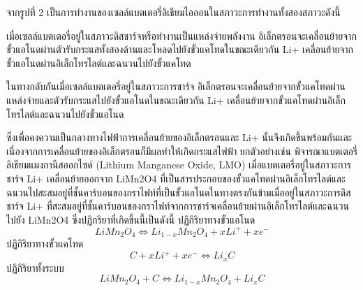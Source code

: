 จากรูปที่ 2 เป็นการทำงานของเซลล์แบตเตอรี่ลิเธียมไอออนในสภาวะการทำงานทั้งสองสภาวะดังนี้
\begin{itemize}
	{\item
		เมื่อเซลล์แบตเตอรี่อยู่ในสภาวะดิสชาร์จหรือทำงานเป็นแหล่งจ่ายพลังงาน อิเล็กตรอนจะเคลื่อนย้ายจากขั้วแอโนดผ่านตัวรับกระแสทั้งสองด้านและโหลดไปยังขั้วแคโทดในขณะเดียวกัน Li+ เคลื่อนย้ายจากขั้วแอโนดผ่านอิเล็กโทรไลต์และฉนวนไปยังขั้วแคโทด}
	{\item
		ในทางกลับกันเมื่อเซลล์แบตเตอรี่อยู่ในสภาวะการชาร์จ อิเล็กตรอนจะเคลื่อนย้ายจากขั้วแคโทดผ่านแหล่งจ่ายและตัวรับกระแสไปยังขั้วแอโนดในขณะเดียวกัน Li+ เคลื่อนย้ายจากขั้วแคโทดผ่านอิเล็กโทรไลต์และฉนวนไปยังขั้วแอโนด}
\end{itemize}
 ซึ่งเพื่อคงความเป็นกลางทางไฟฟ้าการเคลื่อนย้ายของอิเล็กตรอนและ Li+ นั้นจึงเกิดขึ้นพร้อมกันและเนื่องจากการเคลื่อนย้ายของอิเล็กตรอนก็มีผลทำให้เกิดกระแสไฟฟ้า
\newline ยกตัวอย่างเช่น พิจารณาแบตเตอรี่ลิเธียมแมงกานีสออกไซด์ (Lithium Manganese Oxide, LMO) เมื่อแบตเตอรี่อยู่ในสภาวะการชาร์จ Li+ เคลื่อนย้ายออกจาก LiMn2O4 ที่เป็นสารประกอบของขั้วแคโทดผ่านอิเล็กโทรไลต์และฉนวนไปสะสมอยู่ที่ชั้นคาร์บอนของกราไฟท์ที่เป็นขั้วแอโนดในทางตรงกันข้ามเมื่ออยู่ในสภาวะการดิสชาร์จ Li+ ที่สะสมอยู่ที่ชั้นคาร์บอนของกราไฟท์จากการชาร์จเคลื่อนย้ายผ่านอิเล็กโทรไลต์และฉนวนไปยัง LiMn2O4 ซึ่งปฏิกริยาที่เกิดขึ้นนี้เป็นดังนี้
 \newline ปฏิกิริยาทางขั้วแอโนด
\begin{equation}
LiMn_{2}O_{4} \Leftrightarrow Li_{1-x}Mn_{2}O_{4}+xLi^{+}+xe^{-} \label{eq:1}
\end{equation}
 \newline ปฏิกิริยาทางขั้วแคโทด
\begin{equation}
C+xLi^{+}+xe^{-} \Leftrightarrow Li_{x}C \label{eq:2}
\end{equation}
\newline ปฏิกิริยาทั้งระบบ
\begin{equation}
LiMn_{2}O_{4}+C \Leftrightarrow Li_{1-x}Mn_{2}O_{4}+Li_{x}C \label{eq:3}
\end{equation}
